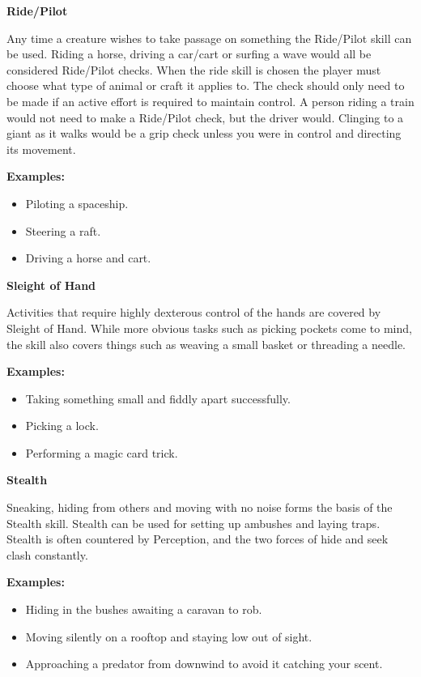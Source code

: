 \textbf{Ride/Pilot}

Any time a creature wishes to take passage on something the Ride/Pilot skill can be used. Riding a horse, driving a car/cart or surfing a wave would all be considered Ride/Pilot checks. When the ride skill is chosen the player must choose what type of animal or craft it applies to. The check should only need to be made if an active effort is required to maintain control. A person riding a train would not need to make a Ride/Pilot check, but the driver would. Clinging to a giant as it walks would be a grip check unless you were in control and directing its movement.

\begin{displayquote}
    \textbf{Examples:}
    \begin{itemize}
        \item Piloting a spaceship.
        \item Steering a raft.
        \item Driving a horse and cart.
    \end{itemize}
\end{displayquote}

\textbf{Sleight of Hand}

Activities that require highly dexterous control of the hands are covered by Sleight of Hand. While more obvious tasks such as picking pockets come to mind, the skill also covers things such as weaving a small basket or threading a needle.

\begin{displayquote}
    \textbf{Examples:}
    \begin{itemize}
        \item Taking something small and fiddly apart successfully.
        \item Picking a lock.
        \item Performing a magic card trick.
    \end{itemize}
\end{displayquote}

\textbf{Stealth}

Sneaking, hiding from others and moving with no noise forms the basis of the Stealth skill. Stealth can be used for setting up ambushes and laying traps. Stealth is often countered by Perception, and the two forces of hide and seek clash constantly.

\begin{displayquote}
    \textbf{Examples:}
    \begin{itemize}
        \item Hiding in the bushes awaiting a caravan to rob.
        \item Moving silently on a rooftop and staying low out of sight.
        \item Approaching a predator from downwind to avoid it catching your scent.
    \end{itemize}
\end{displayquote}

